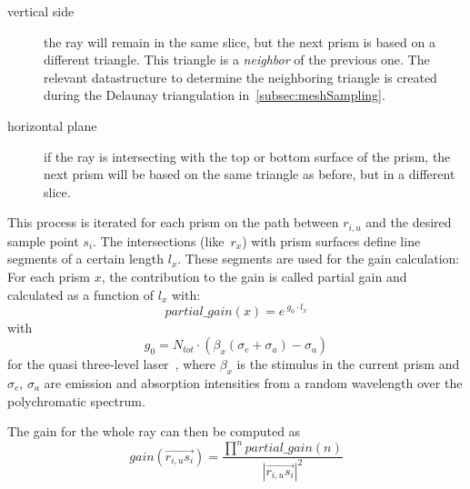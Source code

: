 \begin{description}

  \item[vertical side]
    the ray will remain in the same slice, but the next prism is based on a
    different triangle. This triangle is a \emph{neighbor} of the previous one.
    The relevant datastructure to determine the neighboring triangle is created
    during the Delaunay triangulation in~\cref{subsec:meshSampling}.

  \item[horizontal plane]
    if the ray is intersecting with the top or bottom surface of the prism, the
    next prism will be based on the same triangle as before, but in a different
    slice.

\end{description}
This process is iterated for each prism on the path between $r_{i,u}$ and the
desired sample point $s_i$. The intersections (like~$r_x$) with prism surfaces
define line segments of a certain length $l_x$. These segments are used for the
gain calculation: For each prism $x$, the contribution to the gain is called
partial gain and calculated as a function of $l_x$ with:
\begin{equation}
\label{eq:partial_gain}
  partial\_gain(x) = e^{~g_0 \cdot l_x}
\end{equation}
with 
\begin{equation}
\label{eq:gain_local}
  g_0 = N_{tot} \cdot (\beta_x(\sigma_e + \sigma_a) - \sigma_a) 
\end{equation}
for the quasi three-level laser~\cite{Intro4},
where $\beta_x$ is the stimulus in the current
prism and $\sigma_e$, $\sigma_a$ are emission and absorption
intensities from a random wavelength over the polychromatic spectrum.

The gain for the whole ray can then be computed as
\begin{equation}
\label{eq:gain}
  gain(\overrightarrow{r_{i,u}s_i}) =  
  \frac{\prod^npartial\_gain(n)}{ |\overrightarrow{r_{i,u}s_i}|^2}  
\end{equation}


